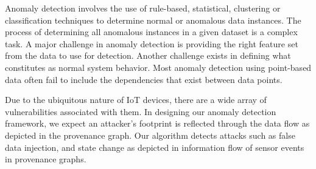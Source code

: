 %
%
%
%
%
%
%
%
%

Anomaly detection involves the use of rule-based, statistical, clustering or classification techniques to determine normal or anomalous data instances. The process of determining all anomalous instances in a given dataset is a complex task. A major challenge in anomaly detection is providing the right feature set from the data to use for detection. Another challenge exists in defining what constitutes as normal system behavior. Most anomaly detection using point-based data often fail to include the dependencies that exist between data points. 

\par Due to the ubiquitous nature of IoT devices, there are a wide array of vulnerabilities associated with them. In designing our anomaly detection framework, we expect an attacker's footprint is reflected through the data flow as depicted in the provenance graph. Our algorithm detects attacks such as false data injection, and state change as depicted in information flow of sensor events in provenance graphs.


